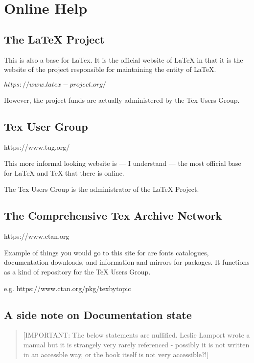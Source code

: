 \documentclass[11pt, oneside]{memoir}
\begin{document}
\section{Online Help}

\subsection{The LaTeX Project}

This is also a base for LaTex. It is the official website of LaTeX in that it is the website of the project responsible for maintaining the entity of LaTeX.

$https://www.latex-project.org/$

However, the project funds are actually administered by the Tex Users Group.

\subsection{Tex User Group}

https://www.tug.org/

This more informal looking website is — I understand — the most official base for LaTeX and TeX that there is online. 

The Tex Users Group is the administrator of the LaTeX Project.

\subsection{The Comprehensive Tex Archive Network}
\label{TUG}
https://www.ctan.org

Example of things you would go to this site for are fonts catalogues, documentation downloads, and information and mirrors for packages. It functions as a kind of repository for the TeX Users Group.

e.g.
https://www.ctan.org/pkg/texbytopic

\subsection{A side note on Documentation state}


\begin{quotation}
[IMPORTANT: The below statements are nullified. Leslie Lamport wrote a manual but it is strangely very rarely referenced - possibly it is not written in an accessble way, or the book itself is not very accessible?!]
\end{quotation}
\end{document}
